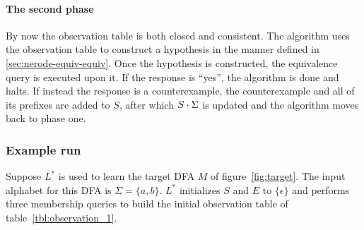 \newpage
\paragraph{The second phase} By now the observation table is both closed and
consistent. The algorithm uses the observation table to construct a hypothesis
in the manner defined in \cref{sec:nerode-equiv-equiv}. Once the hypothesis is
constructed, the equivalence query is executed upon it. If the response is
``yes'', the algorithm is done and halts. If instead the response is a
counterexample, the counterexample and all of its prefixes are added to $S$,
after which $S \cdot \Sigma$ is updated and the algorithm moves back to phase
one.

\subsubsection{Example run}
\label{sec:example-run}
Suppose $L^*$ is used to learn the target DFA $M$ of figure~\ref{fig:target}.
The input alphabet for this DFA is $\Sigma = \{a, b\}$. $L^*$ initializes $S$
and $E$ to $\{\epsilon\}$ and performs three membership queries to build the
initial observation table of table~\ref{tbl:observation_1}.

